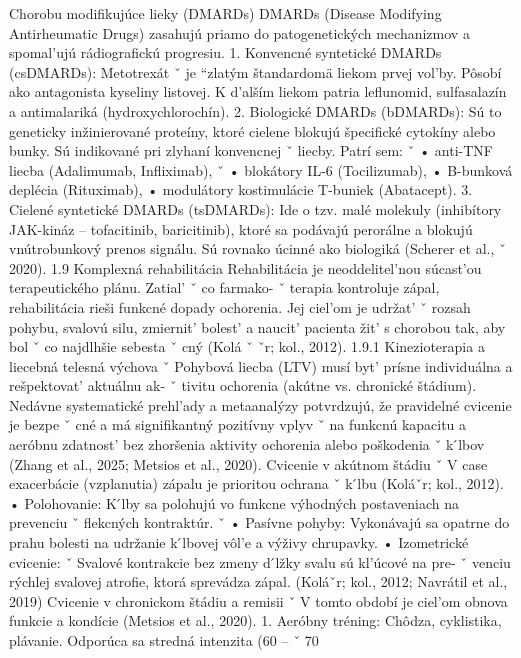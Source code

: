 { Chorobu modifikujúce lieky (DMARDs) DMARDs (Disease Modifying Antirheumatic Drugs) zasahujú priamo do patogenetických mechanizmov a spomal’ujú rádiografickú progresiu.
 1. Konvencné syntetické DMARDs (csDMARDs): Metotrexát ˇ je ``zlatým štandardomä liekom prvej vol’by. Pôsobí ako antagonista kyseliny listovej. K d’alším liekom patria leflunomid, sulfasalazín a antimalariká (hydroxychlorochín).
 2. Biologické DMARDs (bDMARDs): Sú to geneticky inžinierované proteíny, ktoré cielene blokujú špecifické cytokíny alebo bunky. Sú indikované pri zlyhaní konvencnej ˇ liecby. Patrí sem: ˇ • anti-TNF liecba (Adalimumab, Infliximab), ˇ • blokátory IL-6 (Tocilizumab), • B-bunková deplécia (Rituximab), • modulátory kostimulácie T-buniek (Abatacept).
 3. Cielené syntetické DMARDs (tsDMARDs): Ide o tzv. malé molekuly (inhibítory JAK-kináz – tofacitinib, baricitinib), ktoré sa podávajú perorálne a blokujú vnútrobunkový prenos signálu. Sú rovnako úcinné ako biologiká (Scherer et al., ˇ 2020).
 1.9 Komplexná rehabilitácia Rehabilitácia je neoddelitel’nou súcast’ou terapeutického plánu. Zatial’ ˇ co farmako- ˇ terapia kontroluje zápal, rehabilitácia rieši funkcné dopady ochorenia. Jej ciel’om je udržat’ ˇ rozsah pohybu, svalovú silu, zmiernit’ bolest’ a naucit’ pacienta žit’ s chorobou tak, aby bol ˇ co najdlhšie sebesta ˇ cný (Kolá ˇ ˇr; kol., 2012).
 1.9.1 Kinezioterapia a liecebná telesná výchova ˇ Pohybová liecba (LTV) musí byt’ prísne individuálna a rešpektovat’ aktuálnu ak- ˇ tivitu ochorenia (akútne vs. chronické štádium). Nedávne systematické prehl’ady a metaanalýzy potvrdzujú, že pravidelné cvicenie je bezpe ˇ cné a má signifikantný pozitívny vplyv ˇ na funkcnú kapacitu a aeróbnu zdatnost’ bez zhoršenia aktivity ochorenia alebo poškodenia ˇ k ́lbov (Zhang et al., 2025; Metsios et al., 2020).
 Cvicenie v akútnom štádiu ˇ V case exacerbácie (vzplanutia) zápalu je prioritou ochrana ˇ k ́lbu (Koláˇr; kol., 2012).
 • Polohovanie: K ́lby sa polohujú vo funkcne výhodných postaveniach na prevenciu ˇ flekcných kontraktúr. ˇ • Pasívne pohyby: Vykonávajú sa opatrne do prahu bolesti na udržanie k ́lbovej vôl’e a výživy chrupavky.
 • Izometrické cvicenie: ˇ Svalové kontrakcie bez zmeny d ́lžky svalu sú kl’úcové na pre- ˇ venciu rýchlej svalovej atrofie, ktorá sprevádza zápal.
 (Koláˇr; kol., 2012; Navrátil et al., 2019) Cvicenie v chronickom štádiu a remisii ˇ V tomto období je ciel’om obnova funkcie a kondície (Metsios et al., 2020).
 1. Aeróbny tréning: Chôdza, cyklistika, plávanie. Odporúca sa stredná intenzita (60 – ˇ 70 %
}
